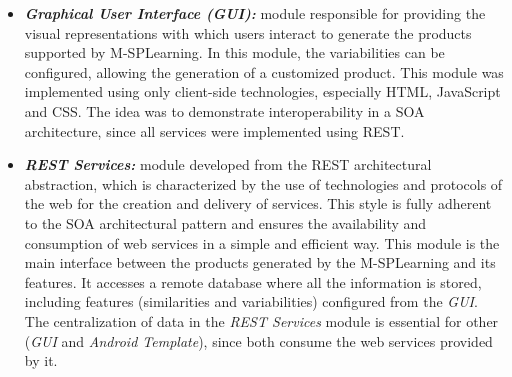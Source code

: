 \begin{itemize}
	\item \textbf{\textit{Graphical User Interface (GUI):}} module responsible for providing the visual representations with which users interact to generate the products supported by M-SPLearning. In this module, the variabilities can be configured, allowing the generation of a customized product. This module was implemented using only client-side technologies, especially HTML, JavaScript and CSS. The idea was to demonstrate interoperability in a SOA architecture, since all services were implemented using REST.
	
	\item \textbf{\textit{REST Services:}} module developed from the REST architectural abstraction, which is characterized by the use of technologies and protocols of the web for the creation and delivery of services. This style is fully adherent to the SOA architectural pattern and ensures the availability and consumption of web services in a simple and efficient way. This module is the main interface between the products generated by the M-SPLearning and its features. It accesses a remote database where all the information is stored, including features (similarities and variabilities) configured from the \textit{GUI}. The centralization of data in the \textit{REST Services} module is essential for other (\textit{GUI} and \textit{Android Template}), since both consume the web services provided by it.
	

\end{itemize}
